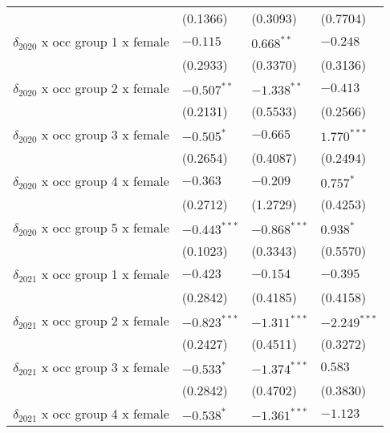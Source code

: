 \begin{tabular}{llll}
                                         &           (0.1366) &           (0.3093) &           (0.7704) \\
$\delta_{2020}$ x occ group 1 x female   &           $-0.115$ &       $0.668^{**}$ &           $-0.248$ \\
                                         &           (0.2933) &           (0.3370) &           (0.3136) \\
$\delta_{2020}$ x occ group 2 x female   &      $-0.507^{**}$ &      $-1.338^{**}$ &           $-0.413$ \\
                                         &           (0.2131) &           (0.5533) &           (0.2566) \\
$\delta_{2020}$ x occ group 3 x female   &         $-0.505^*$ &           $-0.665$ &      $1.770^{***}$ \\
                                         &           (0.2654) &           (0.4087) &           (0.2494) \\
$\delta_{2020}$ x occ group 4 x female   &           $-0.363$ &           $-0.209$ &          $0.757^*$ \\
                                         &           (0.2712) &           (1.2729) &           (0.4253) \\
$\delta_{2020}$ x occ group 5 x female   &     $-0.443^{***}$ &     $-0.868^{***}$ &          $0.938^*$ \\
                                         &           (0.1023) &           (0.3343) &           (0.5570) \\
$\delta_{2021}$ x occ group 1 x female   &           $-0.423$ &           $-0.154$ &           $-0.395$ \\
                                         &           (0.2842) &           (0.4185) &           (0.4158) \\
$\delta_{2021}$ x occ group 2 x female   &     $-0.823^{***}$ &     $-1.311^{***}$ &     $-2.249^{***}$ \\
                                         &           (0.2427) &           (0.4511) &           (0.3272) \\
$\delta_{2021}$ x occ group 3 x female   &         $-0.533^*$ &     $-1.374^{***}$ &            $0.583$ \\
                                         &           (0.2842) &           (0.4702) &           (0.3830) \\
$\delta_{2021}$ x occ group 4 x female   &         $-0.538^*$ &     $-1.361^{***}$ &           $-1.123$ \\

\end{tabular}
